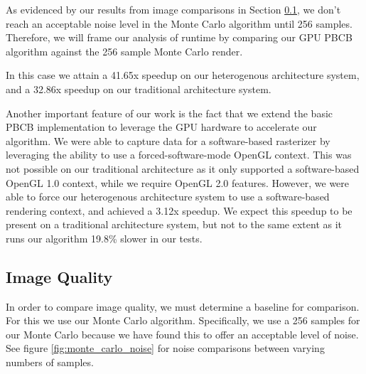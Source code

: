 As evidenced by our results from image comparisons in Section \ref{sec:img_quality}, we don't reach an acceptable noise level in the Monte Carlo algorithm until 256 samples. Therefore, we will frame our analysis of runtime by comparing our GPU PBCB algorithm against the 256 sample Monte Carlo render.

In this case we attain a 41.65x speedup on our heterogenous architecture system, and a 32.86x speedup on our traditional architecture system.

Another important feature of our work is the fact that we extend the basic PBCB implementation to leverage the GPU hardware to accelerate our algorithm. We were able to capture data for a software-based rasterizer by leveraging the ability to use a forced-software-mode OpenGL context. This was not possible on our traditional architecture as it only supported a software-based OpenGL 1.0 context, while we require OpenGL 2.0 features. However, we were able to force our heterogenous architecture system to use a software-based rendering context, and achieved a 3.12x speedup. We expect this speedup to be present on a traditional architecture system, but not to the same extent as it runs our algorithm 19.8\% slower in our tests.

\subsection{Image Quality}
\label{sec:img_quality}
In order to compare image quality, we must determine a baseline for comparison. For this we use our Monte Carlo algorithm. Specifically, we use a 256 samples for our Monte Carlo because we have found this to offer an acceptable level of noise. See figure \ref{fig:monte_carlo_noise} for noise comparisons between varying numbers of samples.

